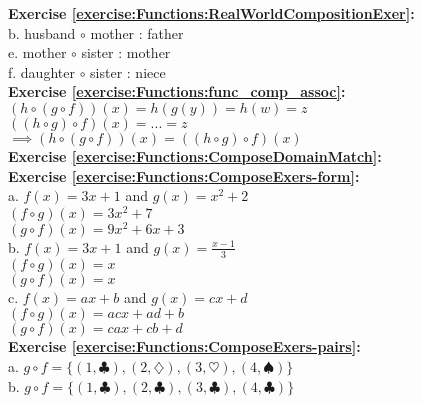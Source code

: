 
\noindent\textbf{Exercise \ref{exercise:Functions:RealWorldCompositionExer}:}\\
b. husband $\circ$ mother : father\\
e. mother $\circ$ sister : mother\\
f. daughter $\circ$ sister : niece\\

\noindent\textbf{Exercise \ref{exercise:Functions:func_comp_assoc}:}\\
$(h\circ(g\circ f))(x)=h(g(y))=h(w)=z$\\
$((h\circ g)\circ f)(x)=...=z$\\
$\implies (h\circ(g\circ f))(x)=((h\circ g)\circ f)(x)$\\

\noindent\textbf{Exercise \ref{exercise:Functions:ComposeDomainMatch}:}\\

\noindent\textbf{Exercise \ref{exercise:Functions:ComposeExers-form}:}\\
a. $f(x)=3x+1$ and $g(x)=x^2+2$\\
$(f\circ g)(x)=3x^2+7$\\
$(g\circ f)(x)=9x^2+6x+3$\\
b. $f(x)=3x+1$ and $g(x)=\displaystyle\frac{x-1}{3}$\\
$(f\circ g)(x)=x$\\
$(g\circ f)(x)=x$\\
c. $f(x)=ax+b$ and $g(x)=cx+d$\\
$(f\circ g)(x)=acx+ad+b$\\
$(g\circ f)(x)=cax+cb+d$\\

\noindent\textbf{Exercise \ref{exercise:Functions:ComposeExers-pairs}:}\\
a. $g\circ f=\{(1,\clubsuit),(2,\diamondsuit),(3,\heartsuit),(4,\spadesuit)\}$\\
b. $g\circ f=\{(1,\clubsuit),(2,\clubsuit),(3,\clubsuit),(4,\clubsuit)\}$\\


